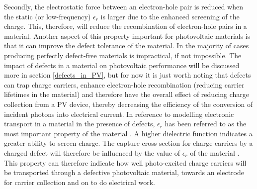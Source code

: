 Secondly, the electrostatic force between an electron-hole pair is reduced when the static (or low-frequency) $\epsilon_r$ is larger \cite{dielectric_const1} due to the enhanced screening of the charge. This, therefore, will reduce the recombination of electron-hole pairs in a material. Another aspect of this property important for photovoltaic materials is that it can improve the defect tolerance of the material. In the majority of cases producing perfectly defect-free materials is impractical, if not impossible. The impact of defects in a material on photovoltaic performance will be discussed more in section \ref{defects_in_PV}, but for now it is just worth noting that defects can trap charge carriers, enhance electron-hole recombination (reducing carrier lifetimes in the material) and therefore have the overall effect of reducing charge collection from a PV device, thereby decreasing the efficiency of the conversion of incident photons into electrical current.
In reference to modelling electronic transport in a material in the presence of defects, $\epsilon_r$ has been referred to as the most important property of the material \cite{defect_tolerance}. A higher dielectric function indicates a greater ability to screen charge. The capture cross-section for charge carriers by a charged defect will therefore be influenced by the value of $\epsilon_r$ of the material \cite{defect_tolerance}. This property can therefore indicate how well photo-excited charge carriers will be transported through a defective photovoltaic material, towards an electrode for carrier collection and on to do electrical work.

